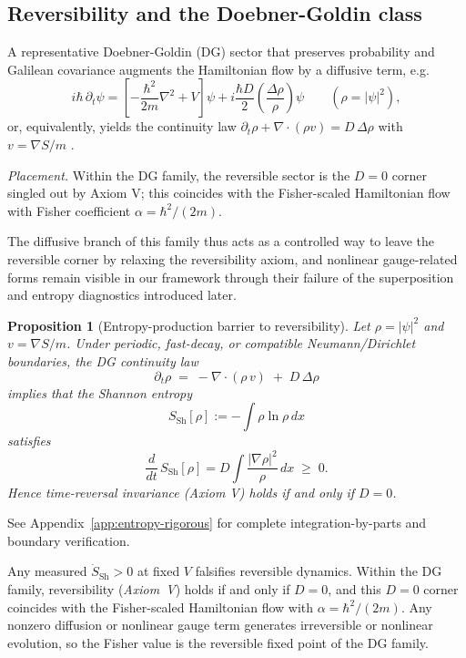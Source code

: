 \documentclass[11pt,a4paper]{article}
\numberwithin{equation}{section}
\theoremstyle{thmcompact}
\newtheorem{proposition}[theorem]{Proposition}
\theoremstyle{remark}
\begin{document}
	
\subsection{Reversibility and the Doebner-Goldin class}
	
A representative Doebner-Goldin (DG) sector that preserves probability and Galilean covariance augments the Hamiltonian flow by a diffusive term, e.g.
\[
i\hbar\,\partial_t\psi
=\left[-\frac{\hbar^2}{2m}\nabla^2+V\right]\psi
+i\frac{\hbar D}{2}\left(\frac{\Delta\rho}{\rho}\right)\psi \qquad (\rho=|\psi|^{2}),
\]
or, equivalently, yields the continuity law
\(
\partial_t\rho+\nabla\!\cdot(\rho v)=D\,\Delta\rho
\)
with $v=\nabla S/m$ \cite{doebner1992,doebner1996,diosi1989}.


\textit{Placement.} Within the DG family, the reversible sector is the $D=0$ corner singled out by Axiom V; this coincides with the Fisher-scaled Hamiltonian flow with Fisher coefficient $\alpha=\hbar^{2}/(2m)$.

The diffusive branch of this family thus acts as a controlled way to leave the reversible corner by relaxing the reversibility axiom, and nonlinear gauge-related forms remain visible in our framework through their failure of the superposition and entropy diagnostics introduced later.


\begin{proposition}[Entropy-production barrier to reversibility]
	Let $\rho=|\psi|^2$ and $v=\nabla S/m$. Under periodic, fast-decay, or compatible Neumann/Dirichlet boundaries,
	the DG continuity law
	\[
	\partial_t \rho \;=\; -\nabla\!\cdot(\rho\,v) \;+\; D\,\Delta\rho
	\]
	implies that the Shannon entropy
	\[
	S_{\mathrm{Sh}}[\rho]:=-\int \rho\ln\rho\,dx
	\]
	satisfies
	\[
	\frac{d}{dt}\,S_{\mathrm{Sh}}[\rho]
	= D\int \frac{|\nabla\rho|^2}{\rho}\,dx \;\geq\; 0.
	\]
	Hence time-reversal invariance (Axiom V) holds if and only if $D=0$.
	
\end{proposition}


See Appendix~\ref{app:entropy-rigorous} for complete integration-by-parts and boundary verification.

Any measured $\dot S_{\mathrm{Sh}}>0$ at fixed $V$ falsifies reversible dynamics. Within the DG family, reversibility (\emph{Axiom~V}) holds if and only if $D=0$, and this $D=0$ corner coincides with the Fisher-scaled Hamiltonian flow with $\alpha=\hbar^{2}/(2m)$. Any nonzero diffusion or nonlinear gauge term generates irreversible or nonlinear evolution, so the Fisher value is the reversible fixed point of the DG family.
	
\end{document}
